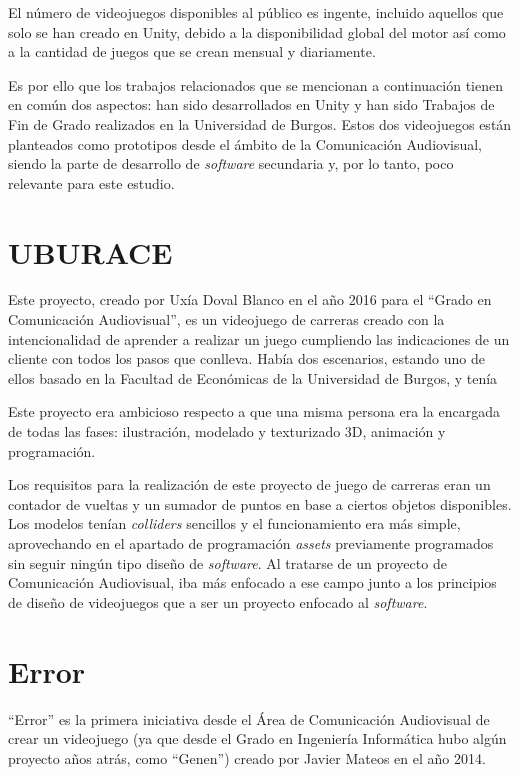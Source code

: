 
El número de videojuegos disponibles al público es ingente, incluido aquellos que solo se han creado en Unity, debido a la disponibilidad global del motor así como a la cantidad de juegos que se crean mensual y diariamente.

Es por ello que los trabajos relacionados que se mencionan a continuación tienen en común dos aspectos: han sido desarrollados en Unity y han sido Trabajos de Fin de Grado realizados en la Universidad de Burgos. Estos dos videojuegos están planteados como prototipos desde el ámbito de la Comunicación Audiovisual, siendo la parte de desarrollo de \textit{software} secundaria y, por lo tanto, poco relevante para este estudio.

\section{UBURACE}

Este proyecto, creado por Uxía Doval Blanco en el año 2016 para el ``Grado en Comunicación Audiovisual'', es un videojuego de carreras creado con la intencionalidad de aprender a realizar un juego cumpliendo las indicaciones de un cliente con todos los pasos que conlleva. Había dos escenarios, estando uno de ellos basado en la Facultad de Económicas de la Universidad de Burgos, y tenía 

Este proyecto era ambicioso respecto a que una misma persona era la encargada de todas las fases: ilustración, modelado y texturizado 3D, animación y programación. 

Los requisitos para la realización de este proyecto de juego de carreras eran un contador de vueltas y un sumador de puntos en base a ciertos objetos disponibles. Los modelos tenían \textit{colliders} sencillos y el funcionamiento era más simple, aprovechando en el apartado de programación \textit{assets} previamente programados sin seguir ningún tipo diseño de \textit{software}. Al tratarse de un proyecto de Comunicación Audiovisual, iba más enfocado a ese campo junto a los principios de diseño de videojuegos que a ser un proyecto enfocado al \textit{software}.

\section{Error}

``Error'' es la primera iniciativa desde el Área de Comunicación Audiovisual de crear un videojuego (ya que desde el Grado en Ingeniería Informática hubo algún proyecto años atrás, como ``Genen'') creado por Javier Mateos en el año 2014.


